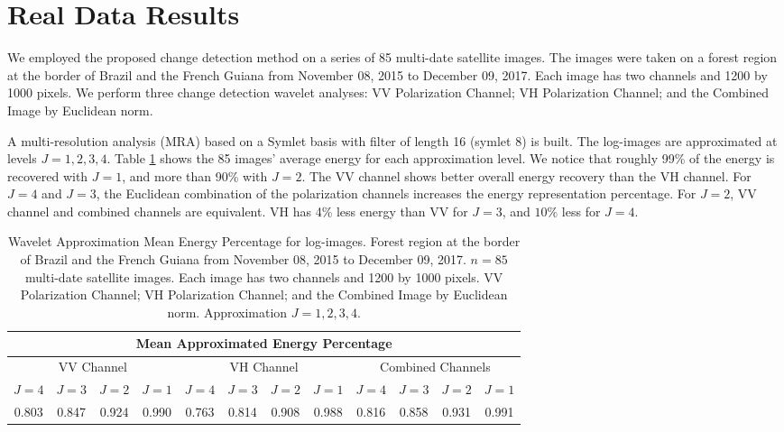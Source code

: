\documentclass[journal]{IEEEtran}
\begin{document}
\section{Real Data Results}\label{section_realdata}

We employed the proposed change detection method on a series of 85 multi-date satellite images. The images were taken on a forest region at the border of Brazil and the French Guiana from November 08, 2015 to December 09, 2017. Each image has two channels and 1200 by 1000 pixels. We perform three change detection wavelet analyses: VV Polarization Channel;  VH Polarization Channel; and the Combined Image by Euclidean norm. 

A multi-resolution analysis (MRA) based on a Symlet basis with filter of length 16 (symlet 8) is built.  The log-images are approximated at levels $J=1,2,3,4$. Table \ref{T:approxenergy} shows the 85 images' average energy for each approximation level. We notice that roughly 99\% of the energy is recovered with $J=1$, and more than  90\% with $J=2$. The VV channel shows better overall energy recovery than the VH channel. For $J=4$ and $J=3$, the Euclidean combination of the polarization channels increases the energy representation percentage.  For $J=2$, VV channel and combined channels are equivalent. VH has 4\% less energy than VV for $J=3$, and $10\%$ less  for $J=4$.

\begin{table}[h!]
\caption{Wavelet Approximation Mean Energy Percentage for log-images. Forest region at the border of Brazil and the French Guiana from November 08, 2015 to December 09, 2017. $n=85$ multi-date satellite images. Each image has two channels and 1200 by 1000 pixels. VV Polarization Channel;  VH Polarization Channel; and the Combined Image by Euclidean norm. Approximation $J=1,2,3,4$.}
\centering
\begin{tabular}{cccc|cccc|cccc}
\hline
\multicolumn{12}{c}{\sc Mean Approximated Energy Percentage}\\
\hline
\multicolumn{4}{c|}{VV Channel}&\multicolumn{4}{c|}{VH Channel}&\multicolumn{4}{c}{Combined Channels}\\
\hline
$J=4$&$J=3$&$J=2$&$J=1$&$J=4$&$J=3$&$J=2$&$J=1$&$J=4$&$J=3$&$J=2$&$J=1$\\
\hline
0.803&0.847&0.924&0.990&0.763&0.814&0.908&0.988&0.816&0.858&0.931&0.991\\
\hline
\end{tabular}\label{T:approxenergy}
\end{table}
\end{document}
